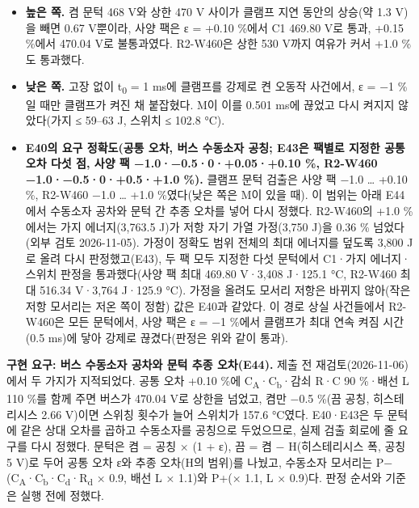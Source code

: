 \begin{itemize}
\item \textbf{높은 쪽.} 켬 문턱 468 V와 상한 470 V 사이가 클램프 지연 동안의 상승(약 1.3 V)을 빼면 0.67 V뿐이라, 사양 팩은 ε = +0.10 \%에서 C1 469.80 V로 통과, +0.15 \%에서 470.04 V로 불통과였다. R2-W460은 상한 530 V까지 여유가 커서 +1.0 \%도 통과했다.
\item \textbf{낮은 쪽.} 고장 없이 t\textsubscript{0} = 1 ms에 클램프를 강제로 켠 오동작 사건에서, ε = −1 \%일 때만 클램프가 켜진 채 붙잡혔다. M이 이를 0.501 ms에 끊었고 다시 켜지지 않았다(가지 ≤ 59–63 J, 스위치 ≤ 102.8 °C).
\item \textbf{E40의 요구 정확도(공통 오차, 버스 수동소자 공칭; E43은 팩별로 지정한 공통 오차 다섯 점, 사양 팩 −1.0·−0.5·0·+0.05·+0.10 \%, R2-W460 −1.0·−0.5·0·+0.5·+1.0 \%).} 클램프 문턱 검출은 사양 팩 −1.0 … +0.10 \%, R2-W460 −1.0 … +1.0 \%였다(낮은 쪽은 M이 있을 때). 이 범위는 아래 E44에서 수동소자 공차와 문턱 간 추종 오차를 넣어 다시 정했다. R2-W460의 +1.0 \%에서는 가지 에너지(3,763.5 J)가 저항 자기 가열 가정(3,750 J)을 0.36 \% 넘었다(외부 검토 2026-11-05). 가정이 정확도 범위 전체의 최대 에너지를 덮도록 3,800 J로 올려 다시 판정했고(E43), 두 팩 모두 지정한 다섯 문턱에서 C1·가지 에너지·스위치 판정을 통과했다(사양 팩 최대 469.80 V·3,408 J·125.1 °C, R2-W460 최대 516.34 V·3,764 J·125.9 °C). 가정을 올려도 모서리 저항은 바뀌지 않아(작은 저항 모서리는 저온 쪽이 정함) 값은 E40과 같았다. 이 경로 상실 사건들에서 R2-W460은 모든 문턱에서, 사양 팩은 ε = −1 \%에서 클램프가 최대 연속 켜짐 시간(0.5 ms)에 닿아 강제로 끊겼다(판정은 위와 같이 통과).
\end{itemize}

\textbf{구현 요구: 버스 수동소자 공차와 문턱 추종 오차(E44).} 제출 전 재검토(2026-11-06)에서 두 가지가 지적되었다. 공통 오차 +0.10 \%에 C\textsubscript{A}·C\textsubscript{b}·감쇠 R·C 90 \%·배선 L 110 \%를 함께 주면 버스가 470.04 V로 상한을 넘었고, 켬만 −0.5 \%(끔 공칭, 히스테리시스 2.66 V)이면 스위칭 횟수가 늘어 스위치가 157.6 °C였다. E40·E43은 두 문턱에 같은 상대 오차를 곱하고 수동소자를 공칭으로 두었으므로, 실제 검출 회로에 줄 요구를 다시 정했다. 문턱은 켬 = 공칭 × (1 + ε), 끔 = 켬 − H(히스테리시스 폭, 공칭 5 V)로 두어 공통 오차 ε와 추종 오차(H의 범위)를 나눴고, 수동소자 모서리는 P−(C\textsubscript{A}·C\textsubscript{b}·C\textsubscript{d}·R\textsubscript{d} × 0.9, 배선 L × 1.1)와 P+(× 1.1, L × 0.9)다. 판정 순서와 기준은 실행 전에 정했다.

